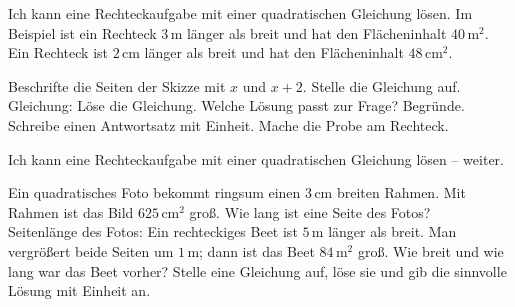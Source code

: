 \begin{aufgabe}{Ich kann eine Rechteckaufgabe mit einer quadratischen Gleichung lösen. Im Beispiel ist ein Rechteck $3\,$m länger als breit und hat den Flächeninhalt $40\,\text{m}^2$.}
Ein Rechteck ist $2\,$cm länger als breit und hat den Flächeninhalt $48\,\text{cm}^2$.


\begin{teile}
\teil Beschrifte die Seiten der Skizze mit $x$ und $x + 2$. Stelle die Gleichung auf.\\ Gleichung: \leerfeld \leerfeld
\teil Löse die Gleichung. \quad {}
\teil Welche Lösung passt zur Frage? Begründe.
\teil Schreibe einen Antwortsatz mit Einheit.
\teil Mache die Probe am Rechteck.
\end{teile}
\end{aufgabe}

\begin{aufgabe}{Ich kann eine Rechteckaufgabe mit einer quadratischen Gleichung lösen – weiter.}
\begin{teile}
\teil Ein quadratisches Foto bekommt ringsum einen $3\,$cm breiten Rahmen. Mit Rahmen ist das Bild $625\,\text{cm}^2$ groß. Wie lang ist eine Seite des Fotos?\\ Seitenlänge des Fotos: \leerfeld[cm]
\teil Ein rechteckiges Beet ist $5\,$m länger als breit. Man vergrößert beide Seiten um $1\,$m; dann ist das Beet $84\,\text{m}^2$ groß. Wie breit und wie lang war das Beet vorher? Stelle eine Gleichung auf, löse sie und gib die sinnvolle Lösung mit Einheit an.
\end{teile}
\end{aufgabe}


